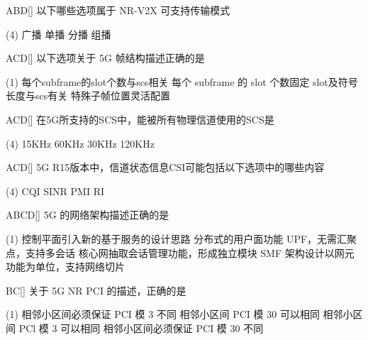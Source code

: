 \begin{choice}{\;ABD\;}[]
    以下哪些选项属于 NR-V2X 可支持传输模式
    \begin{tasks}(4)
        \task 广播
        \task 单播
        \task 分播
        \task 组播
    \end{tasks}
\end{choice}

\begin{choice}{\;ACD\;}[]
    以下选项关于 5G 帧结构描述正确的是
    \begin{tasks}(1)
        \task 每个subframe的slot个数与scs相关
        \task 每个 subframe 的 slot 个数固定
        \task  slot及符号长度与scs有关
        \task 特殊子帧位置灵活配置
    \end{tasks}
\end{choice}

\begin{choice}{\;ACD\;}[]
    在5G所支持的SCS中，能被所有物理信道使用的SCS是
    \begin{tasks}(4)
        \task 15KHz
        \task 60KHz
        \task 30KHz
        \task 120KHz
    \end{tasks}
\end{choice}

\begin{choice}{\;ACD\;}[]
    5G R15版本中，信道状态信息CSI可能包括以下选项中的哪些内容
    \begin{tasks}(4)
        \task  CQI
        \task SINR
        \task PMI
        \task RI
    \end{tasks}
\end{choice}

\begin{choice}{\;ABCD\;}[]
    5G 的网络架构描述正确的是
    \begin{tasks}(1)
        \task 控制平面引入新的基于服务的设计思路
        \task 分布式的用户面功能 UPF，无需汇聚点，支持多会话
        \task 核心网抽取会话管理功能，形成独立模块 SMF
        \task 架构设计以网元功能为单位，支持网络切片
    \end{tasks}
\end{choice}

\begin{choice}{\;BC\;}[]
    关于 5G NR PCI 的描述，正确的是
    \begin{tasks}(1)
        \task 相邻小区间必须保证 PCI 模 3 不同
        \task 相邻小区间 PCI 模 30 可以相同
        \task 相邻小区间 PCl 模 3 可以相同
        \task 相邻小区间必须保证 PCI 模 30 不同
    \end{tasks}
\end{choice}

